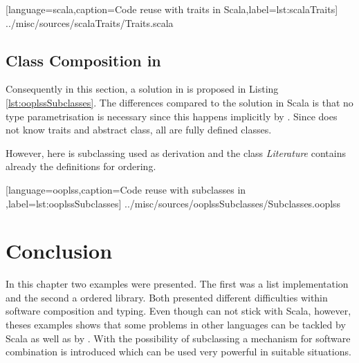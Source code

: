 
[language=scala,caption=Code reuse with traits in Scala,label=lst:scalaTraits]
{../misc/sources/scalaTraits/Traits.scala}

\subsection{Class Composition in \ooplss}
Consequently in this section, a solution in \ooplss is proposed in Listing
\ref{lst:ooplssSubclasses}. The differences compared to the solution in
Scala is that no type parametrisation is necessary since this happens
implicitly by \mytype. Since \ooplss does not know traits and abstract
class, all are fully defined classes.

However, here is subclassing used as derivation and the class
\emph{Literature} contains already the definitions for ordering.


[language=ooplss,caption=Code reuse with subclasses in \ooplss,label=lst:ooplssSubclasses]
{../misc/sources/ooplssSubclasses/Subclasses.ooplss}

\section{Conclusion}
In this chapter two examples were presented. The first was a list
implementation and the second a ordered library. Both presented
different difficulties within software composition and typing. Even
though \ooplss can not stick with Scala, however, theses examples shows
that some problems in other languages can be tackled by Scala as well
as by \ooplss. With the possibility of subclassing a mechanism for
software combination is introduced which can be used very powerful in
suitable situations.
